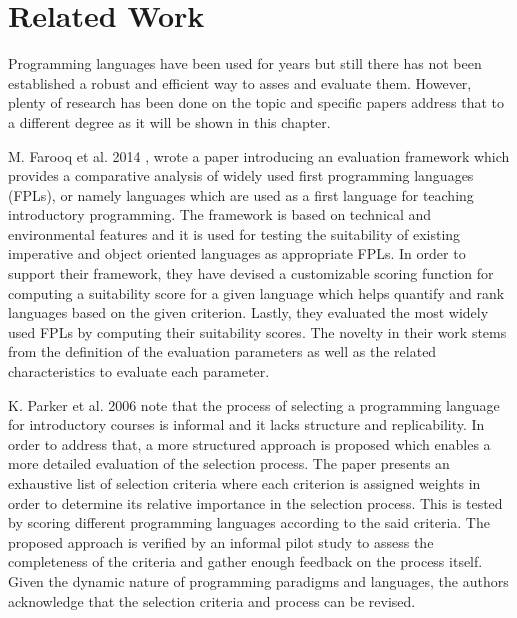 \chapter{Related Work}
\label{chap:related_work}

Programming languages have been used for years but still there has not been established a robust and efficient way to asses and evaluate them. However, plenty of research has been done on the topic and specific papers address that to a different degree as it will be shown in this chapter.

M. Farooq et al. 2014 , wrote a paper introducing an evaluation framework which provides a comparative analysis of widely used first programming languages (FPLs), or namely languages which are used as a first language for teaching introductory programming. The framework is based on technical and environmental features and it is used for testing the suitability of existing imperative and object oriented languages as appropriate FPLs. In order to support their framework, they have devised a customizable scoring function for computing a  suitability score for a given language which helps quantify and rank languages based on the given criterion. Lastly, they evaluated the most widely used FPLs by computing their suitability scores. The novelty in their work stems from the definition of the evaluation parameters as well as the related characteristics to evaluate each parameter.

K. Parker et al. 2006  note that the process of selecting a programming language for introductory courses is informal and it lacks structure and replicability. In order to address that, a more structured approach is proposed which enables a more detailed evaluation of the selection process. The paper presents an exhaustive list of selection criteria  where each criterion is assigned weights in order to determine its relative importance in the selection process. This is tested by scoring different programming languages according to the said criteria. The proposed approach is verified by an informal pilot study to assess the completeness of the criteria and gather enough feedback on the process itself. Given the dynamic nature of programming paradigms and languages, the authors acknowledge that the selection criteria and process can be revised.

